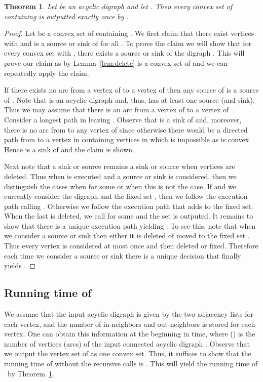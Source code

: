 \documentclass[11pt]{article}
\newcommand{\2}{\vspace{0.2 cm}}
\newtheorem{theorem}{Theorem}[section]
\newcommand\cs{{}}
\begin{document}
\begin{theorem}\label{prop:unique}
Let  be an acyclic digraph and let . Then
every convex set of  containing  is outputted exactly once by
{\cs}.
\end{theorem}
\begin{proof}
Let  be a convex set of  containing . We first claim that
there exist vertices  with
 and  is a source or sink of
 for all . To prove the claim we will show that for every convex set 
with
 , there exists a source or sink  of
the digraph . This will prove our claim as by
Lemma~\ref{lem:delete}  is a convex set of  and we
can repeatedly apply the claim.

If there exists no arc from a vertex of  to  a vertex of
 then any source of  is a source of
. Note that  is an acyclic digraph and, thus,
has at least one source (and sink). Thus we may assume that there is
an arc from a vertex  of  to a vertex  of .
Consider a longest path  in 
leaving . Observe that  is a sink of  and,
moreover, there is no arc from  to any vertex of  since
otherwise there would be a directed path from  to a vertex
in  containing vertices in  which is impossible as
 is convex. Hence  is a sink of  and the claim is
shown.

Next note that a sink or source remains a sink or source when
vertices are deleted. Thus when {\cs} is executed and  a
source or sink  is considered, then we distinguish the cases when
 for some  or when this is not the
case. If   and we currently consider the digraph  and the
fixed set , then we follow the execution path calling
{\cs}. Otherwise we follow the execution path that adds
 to the fixed set. When the last  is deleted, we call
{\cs}  for some  and the set  is outputed. It
remains to show that there is a unique execution path yielding .
To see this, note that when we consider a source or sink  then
either it is deleted of moved to the fixed set . Thus every
vertex is considered at most once and then deleted or fixed.
Therefore each time we consider a source or sink there is a unique
decision that finally yields .
\end{proof}

\subsection{Running time of \cs}

We assume that the input acyclic digraph  is given by
the two adjacency lists for each vertex, and the number of in-neighbors and
out-neighbors is stored for each vertex. One can obtain this
information at the beginning in  time, where  () is
the number of vertices (arcs) of the input connected acyclic digraph . Observe
that we output the vertex set of  as one convex set. Thus, it
suffices to show that the running time of {\cs} without the
recursive calls is . This will yield the running time
 of {\cs}\ by
Theorem~\ref{prop:unique}.
\end{document}
